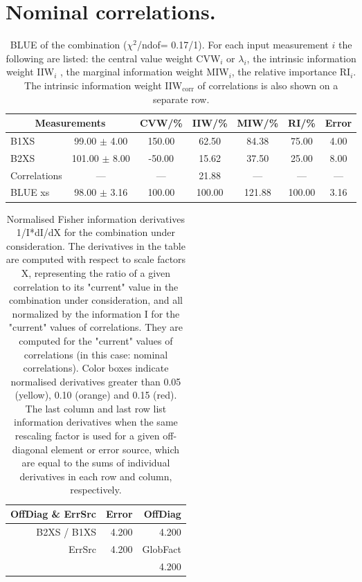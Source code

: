 \section{Nominal correlations.}
\begin{table}[H]
\scriptsize
\begin{center}
\renewcommand{\arraystretch}{1.1}
\begin{tabular}{|lc|c|c|c|c|c|}
\hline
\multicolumn{2}{|c|}{Measurements} & CVW/\%  & IIW/\%  & MIW/\%  & RI/\%  & {\tiny Error}\\
\hline
B1XS &      99.00 $\pm$       4.00 &     150.00 &      62.50 &      84.38 &      75.00 &       4.00\\
B2XS &     101.00 $\pm$       8.00 &     -50.00 &      15.62 &      37.50 &      25.00 &       8.00\\
Correlations & --- & --- &      21.88 & --- & --- & ---\\
\hline
BLUE {\tiny xs} &      98.00 $\pm$       3.16 &     100.00 &     100.00 &     121.88 &     100.00 &       3.16\\
\hline
\end{tabular}
\caption{BLUE of the combination ($\chi^2$/ndof=      0.17/1).
 For each input measurement $i$ the following are listed: the central value weight CVW$_i$ or $\lambda_i$, the intrinsic information weight IIW$_i$ , the marginal information weight MIW$_i$, the relative importance RI$_i$. The intrinsic information weight IIW$_{\mathrm{corr}}$ of correlations is also shown on a separate row.}
\renewcommand{\arraystretch}{1}
\end{center}
\end{table}
\begin{table}[H]
\scriptsize
\begin{center}
\renewcommand{\arraystretch}{1.1}
\begin{tabular}{|r|r|r|}
\hline
 OffDiag \& ErrSrc & {\tiny Error} & OffDiag\\
\hline
B2XS / B1XS &  \colorbox{Tomato1}{    4.200} &  \colorbox{Tomato1}{    4.200} \\
\hline
\multirow{2}{*}{ErrSrc} & \multirow{2}{*}{ \colorbox{Tomato1}{    4.200}} & GlobFact\\
 & &  \colorbox{Tomato1}{    4.200} \\
\hline
\end{tabular}
\renewcommand{\arraystretch}{1}
\caption{Normalised Fisher information derivatives 1/I*dI/dX for the combination under consideration. The derivatives in the table are computed with respect to scale factors X, representing the ratio of a given correlation to its "current" value in the combination under consideration, and all normalized by the information I for the "current" values of correlations. They are computed for the "current" values of correlations (in this case: nominal correlations). Color boxes indicate normalised derivatives greater than 0.05 (yellow), 0.10 (orange) and 0.15 (red). The last column and last row list information derivatives when the same rescaling factor is used for a given off-diagonal element or error source, which are equal to the sums of individual derivatives in each row and column, respectively.}
\end{center}
\end{table}
